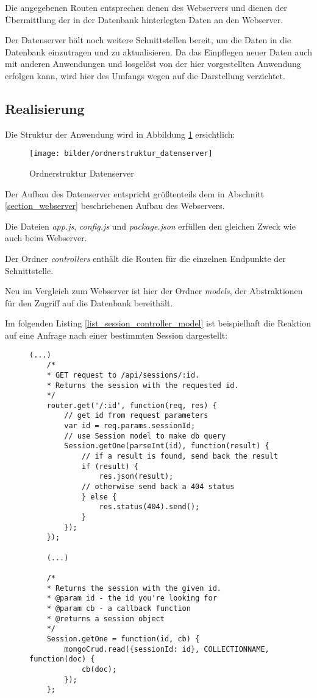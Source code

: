 Die angegebenen Routen entsprechen denen des Webservers und dienen der Übermittlung 
der in der Datenbank hinterlegten Daten an den Webserver.

Der Datenserver hält noch weitere Schnittstellen bereit, um die Daten in die Datenbank einzutragen
und zu aktualisieren. Da das Einpflegen neuer Daten auch mit anderen Anwendungen und losgelöst
von der hier vorgestellten Anwendung erfolgen kann, wird hier des Umfangs wegen auf die Darstellung verzichtet.

\subsection{Realisierung}
Die Struktur der Anwendung wird in Abbildung \ref{fig_struktur_datenserver} ersichtlich:

\begin{figure}[h]
	\centering
	\texttt{[image: bilder/ordnerstruktur\_datenserver]}
	\caption{Ordnerstruktur Datenserver}
	\label{fig_struktur_datenserver}
\end{figure}

Der Aufbau des Datenserver entspricht größtenteils dem in Abschnitt \ref{section_webserver} beschriebenen Aufbau des Webservers.

Die Dateien \textit{app.js}, \textit{config.js} und \textit{package.json} erfüllen 
den gleichen Zweck wie auch beim Webserver.

Der Ordner \textit{controllers} enthält die Routen für die einzelnen Endpunkte der Schnittstelle.

Neu im Vergleich zum Webserver ist hier der Ordner \textit{models}, der Abstraktionen 
für den Zugriff auf die Datenbank bereithält. %

Im folgenden Listing \ref{list_session_controller_model} ist beispielhaft die Reaktion 
auf eine Anfrage nach einer bestimmten Session dargestellt:

\begin{figure}[h]
	\begin{lstlisting}[caption={Auszug aus den Dateien controllers/sessions.js und models/session.js}, label=list_session_controller_model]
	(...)
	/*
	* GET request to /api/sessions/:id.
	* Returns the session with the requested id.
	*/
	router.get('/:id', function(req, res) {
		// get id from request parameters
	    var id = req.params.sessionId;
	    // use Session model to make db query
		Session.getOne(parseInt(id), function(result) {
			// if a result is found, send back the result
			if (result) {
				res.json(result);
			// otherwise send back a 404 status	
			} else {
				res.status(404).send();
			}
		});
	});
	
	(...)
	
	/*
	* Returns the session with the given id.
	* @param id - the id you're looking for
	* @param cb - a callback function
	* @returns a session object
	*/
	Session.getOne = function(id, cb) {
		mongoCrud.read({sessionId: id}, COLLECTIONNAME, function(doc) {
			cb(doc);
		});
	};
	\end{lstlisting}
\end{figure}

